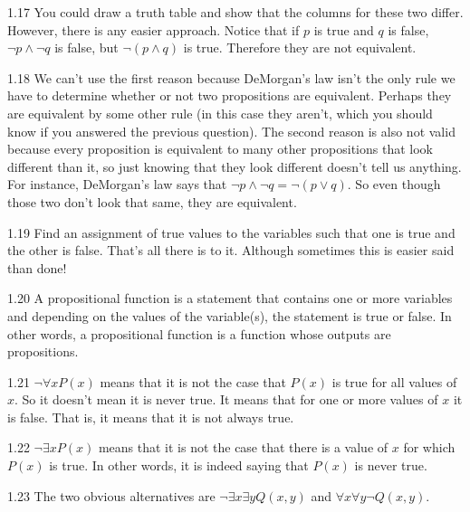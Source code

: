 \begin{RequAnswer}{1.17}
You could draw a truth table and show that the columns for these two differ. However, there is any easier approach.
Notice that if $p$ is true and $q$ is false, $\neg p \wedge \neg q$ is false, but $\neg(p\wedge q)$ is true.
Therefore they are not equivalent.
\end{RequAnswer}
\begin{RequAnswer}{1.18}
We can't use the first reason because DeMorgan's law isn't the
only rule we have to determine whether or not two propositions
are equivalent. Perhaps they are equivalent by some other rule
(in this case they aren't, which you should know if you
answered the previous question).
The second reason is also not valid because
every proposition is equivalent to many other
propositions that look different than it, so just knowing that
they look different doesn't tell us anything. For instance,
DeMorgan's law says that $\neg p \wedge \neg q=\neg(p\vee q)$.
So even though those two don't look that same, they are equivalent.
\end{RequAnswer}
\begin{RequAnswer}{1.19}
Find an assignment of true values to the variables
such that one is true and the other is false. That's all there is to it.
Although sometimes this is easier said than done!
\end{RequAnswer}
\begin{RequAnswer}{1.20}
A propositional function is a statement that contains one or more variables and depending on the values of the variable(s),
the statement is true or false. In other words, a propositional function is a function whose outputs are propositions.
\end{RequAnswer}
\begin{RequAnswer}{1.21}
$\neg\forall x P(x)$ means that it is not the case that $P(x)$ is true for all values of $x$.
So it doesn't mean it is never true. It means that for one or more values of $x$ it is false.
That is, it means that it is not always true.
\end{RequAnswer}
\begin{RequAnswer}{1.22}
$\neg\exists x P(x)$ means that it is not the case that there is a value of $x$ for which $P(x)$ is true.
In other words, it is indeed saying that $P(x)$ is never true.
\end{RequAnswer}
\begin{RequAnswer}{1.23}
The two obvious alternatives are
$\neg\exists x  \exists y Q(x,y)$ and
$\forall x \forall y\neg  Q(x,y)$.
\end{RequAnswer}
